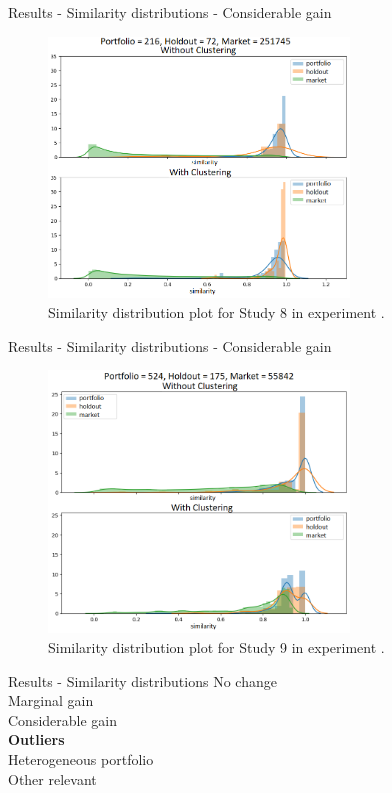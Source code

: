
\begin{frame}{Results - Similarity distributions - Considerable gain}
    \begin{figure}
       \centering
       \includegraphics[width=8cm]{fig/ch4-study-8-considerable-increase-exp-2.png}
       \caption{Similarity distribution plot for Study 8 in experiment \nameExperimentII{}.}
    \end{figure}
\end{frame}


\begin{frame}{Results - Similarity distributions - Considerable gain}
    \begin{figure}
       \centering
       \includegraphics[width=8cm]{fig/ch4-study-9-considerable-decrease-exp-1.png}
       \caption{Similarity distribution plot for Study 9 in experiment \nameExperimentI{}.}
    \end{figure}
\end{frame}


\begin{frame}{Results - Similarity distributions}
    No change \\ 
    \vspace{0.5cm}
    Marginal gain \\
    \vspace{0.5cm}
    Considerable gain \\
    \vspace{0.5cm}
    \textbf{Outliers} \\
    \vspace{0.5cm}
    Heterogeneous portfolio \\
    \vspace{0.5cm}
    Other relevant 
\end{frame}

